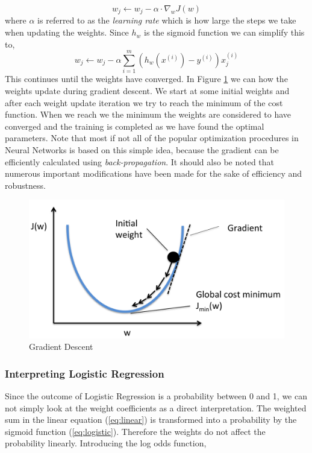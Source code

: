 \begin{equation}
w_{j} \longleftarrow w_{j} - \alpha \cdot \nabla_{w}J(w)
\end{equation}
where $\alpha$ is referred to as the \emph{learning rate} which is how large the steps we take when updating the weights. Since $h_{w}$ is the sigmoid function we can simplify this to, 
\begin{equation}
    w_{j} \longleftarrow w_{j} - \alpha \sum_{i=1}^{m}(h_{w}(x^{(i)}) - y^{(i)})x_{j}^{(i)}
\end{equation}
This continues until the weights have converged.
In Figure \ref{fig-gradient-descent} we can how the weights update during gradient descent. We start at some initial weights and after each weight update iteration we try to reach the minimum of the cost function. When we reach we the minimum the weights are considered to have converged and the training is completed as we have found the optimal parameters. Note that most if not all of the popular optimization procedures in Neural Networks is based on this simple idea, because the gradient can be efficiently calculated using \emph{back-propagation}. It should also be noted that numerous important modifications have been made for the sake of efficiency and robustness.
\begin {figure}[!htpb]
\centering
  \includegraphics[width=\linewidth]{Credit_Images/GradientDescent.png}
   \caption{Gradient Descent \cite{GradientDescent}}
    \label{fig-gradient-descent}
\end{figure}

\subsubsection{Interpreting Logistic Regression} \label{sect:interpreting-logistic-regression}
Since the outcome of Logistic Regression is a probability between 0 and 1, we can not simply look at the weight coefficients as a direct interpretation. The weighted sum in the linear equation (\ref{eq:linear}) is transformed into a probability by the sigmoid function (\ref{eq:logistic}). Therefore the weights do not affect the probability linearly. Introducing the log odds function,

